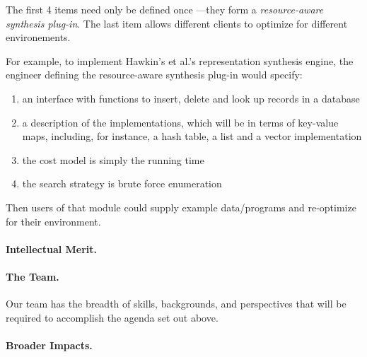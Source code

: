 The first 4 items need only be defined once ---they form a
\emph{resource-aware synthesis plug-in}.  The last item allows
different clients to optimize for different environements.

For example, to implement Hawkin's et al.'s representation synthesis engine, the
engineer defining the resource-aware synthesis plug-in would
specify:

\begin{enumerate}
\item an interface with functions to insert, delete and look up records in a database
\item a description of the implementations, which will be in terms of key-value maps,
including, for instance, a hash table, a list and a vector implementation
\item the cost model is simply the running time
\item the search strategy is brute force enumeration
\end{enumerate}

Then users of that module could supply example data/programs and re-optimize for
their environment.









\paragraph*{Intellectual Merit.}


\paragraph{The Team.}  Our team has the breadth of skills, backgrounds, and perspectives that will be required to accomplish the agenda set out above.  

\paragraph{Broader Impacts.}  

